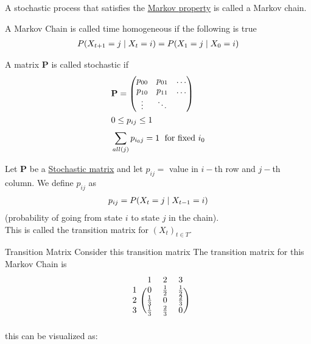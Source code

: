 \documentclass[12pt,a4paper]{article}
\begin{document}
\begin{note}
A stochastic process that satisfies the \hyperref[markovprop]{Markov property} is called a Markov chain.
\end{note}

\begin{defn}
A Markov Chain is called time homogeneous if the following is true
\begin{align*}
P(X_{t+1} = j \;\vert\; X_t = i) = P(X_1 = j \;\vert\; X_0 = i)
\end{align*}
\end{defn}

\begin{defn}
\label{stocmat}

A matrix $\mathbf{P}$ is called stochastic if
\begin{align*}
&\mathbf{P} = \mqty(
p_{00} & p_{01} & \ldots \\
p_{10} & p_{11} & \ldots \\
\vdots  & \ddots &
)\\
&0\leq p_{ij} \leq 1\\
&\nsum{all(j)}{} p_{i_0j} = 1 \; \text{ for fixed $i_0$}
\end{align*}
\end{defn}
\begin{defn}
Let $\mathbf{P}$ be a \hyperref[stocmat]{Stochastic matrix} and let $p_{ij} = $ value in $i-$th row and $j-$th column.
We define $p_{ij}$ as
\begin{align*}
&p_{ij} = P(X_{t} = j \;\vert\; X_{t-1} = i)\\
\end{align*}
(probability of going from state $i$ to state $j$ in the chain). \\
This is called the transition matrix for $(X_t)_{t \in T}$.
\end{defn}
\newpage
\begin{example}{Transition Matrix}
Consider this transition matrix 
The transition matrix for this Markov Chain is
\[
\begin{blockarray}{cccc}
& 1 & 2 & 3 \\
\begin{block}{c(ccc)}
1 & 0 & \frac{1}{2} & \frac{1}{2} \\
2 & \frac{1}{3} & 0 & \frac{2}{3} \\
3 & \frac{1}{3} & \frac{2}{3} & 0 \\
\end{block}
\end{blockarray}
\]
this can be visualized as: 
\end{example}
\newpage
\end{document}
